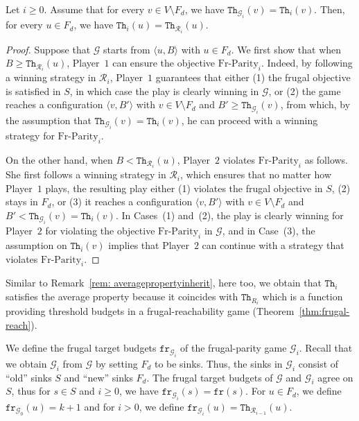 \documentclass{article}\providecommand{\nequiv}{\not\equiv}\usepackage[a4paper,margin=20mm]{geometry}
\newcommand{\PO}{Player~$1$\xspace}
\newcommand{\PT}{Player~$2$\xspace}
\newcommand{\G}{{\mathcal G}}
\newcommand{\R}{{\mathcal R}}
\newcommand{\fr}{\texttt{fr}}
\newcommand{\notFd}{V \setminus F_d}
\newcommand{\thresh}{\texttt{Th}\xspace}
\newcommand{\frparity}{\text{Fr-Parity}}
\newcommand{\zug}[1]{\langle #1  \rangle}
\begin{document}



\begin{lemma}
\label{lem:parity-FrReach}
Let $i \geq 0$. Assume that for every $v \in V \setminus F_d$, we have $\thresh_{\G_i}(v) = \thresh_i(v)$. Then, for every $u \in F_d$, we have $\thresh_i(u) = \thresh_{\R_i}(u)$. 
\end{lemma}
\begin{proof}
Suppose that $\G$ starts from $\zug{u, B}$ with $u \in F_d$. We first show that when $B \geq \thresh_{\R_i}(u)$, \PO can ensure the objective $\frparity_i$. Indeed, by following a winning strategy in $\R_i$, \PO guarantees that either (1) the frugal objective is satisfied in $S$, in which case the play is clearly winning in $\G$, or (2) the game reaches a configuration $\zug{v, B'}$ with $v \in \notFd$ and $B' \geq \thresh_{\G_i}(v)$, from which, by the assumption that $\thresh_{\G_i}(v) = \thresh_i(v)$, he can proceed with a winning strategy for $\frparity_{i}$. 

On the other hand, when $B < \thresh_{\R_i}(u)$, \PT violates $\frparity_i$ as follows. She first follows a winning strategy in $\R_i$, which ensures that no matter how \PO plays, the resulting play either (1) violates the frugal objective in $S$, (2) stays in $F_d$, or (3) it reaches a configuration $\zug{v, B'}$ with $v \in \notFd$ and $B' < \thresh_{\G_i}(v) = \thresh_i(v)$. In Cases~(1) and~(2), the play is clearly winning for \PT for violating the objective \(\frparity_{i}\) in \(\G\), and in Case~(3), the assumption on $\thresh_i(v)$ implies that \PT can continue with a strategy that violates $\frparity_{i}$.
\end{proof}

\begin{remark}
	Similar to Remark~\ref{rem: averagepropertyinherit}, here too, we obtain that \(\thresh_i\) satisfies the average property because it coincides with \(\thresh_{R_i}\) which is a function providing threshold budgets in a frugal-reachability game (Theorem~\ref{thm:frugal-reach}).   
\end{remark}


We define the frugal target budgets $\fr_{\G_i}$ of the frugal-parity game $\G_i$. Recall that we obtain $\G_i$ from $\G$ by setting $F_d$ to be sinks. Thus, the sinks in $\G_i$ consist of ``old'' sinks $S$ and ``new'' sinks $F_d$. The frugal target budgets of $\G$ and $\G_i$ agree on $S$, thus for $s \in S$ and $i \geq 0$, we have $\fr_{\G_i}(s) = \fr(s)$. For $u \in F_d$, we define $\fr_{\G_0}(u) = k+1$ and for $i > 0$, we define $\fr_{\G_i}(u) = \thresh_{\R_{i-1}}(u)$. 
\end{document}
